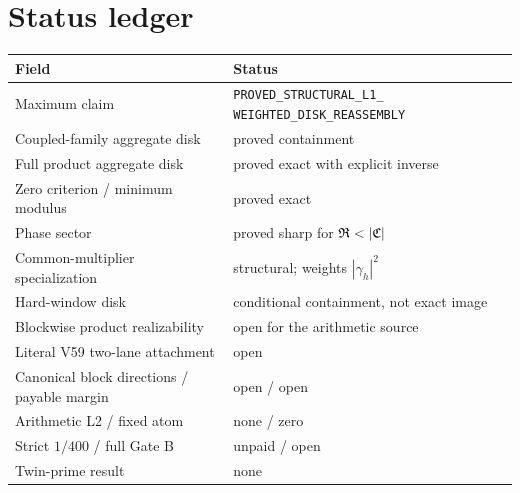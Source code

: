 \section{Status ledger}

\begin{center}
\begin{tabularx}{\textwidth}{@{}lX@{}}
\toprule
Field & Status \\
\midrule
Maximum claim & \texttt{PROVED\_STRUCTURAL\_L1\_}\newline
                \texttt{WEIGHTED\_DISK\_REASSEMBLY} \\
Coupled-family aggregate disk & proved containment \\
Full product aggregate disk & proved exact with explicit inverse \\
Zero criterion / minimum modulus & proved exact \\
Phase sector & proved sharp for $\Ragg<|\Cagg|$ \\
Common-multiplier specialization & structural; weights $|\gamma_h|^2$ \\
Hard-window disk & conditional containment, not exact image \\
Blockwise product realizability & open for the arithmetic source \\
Literal V59 two-lane attachment & open \\
Canonical block directions / payable margin & open / open \\
Arithmetic L2 / fixed atom & none / zero \\
Strict $1/400$ / full Gate B & unpaid / open \\
Twin-prime result & none \\
\bottomrule
\end{tabularx}
\end{center}

